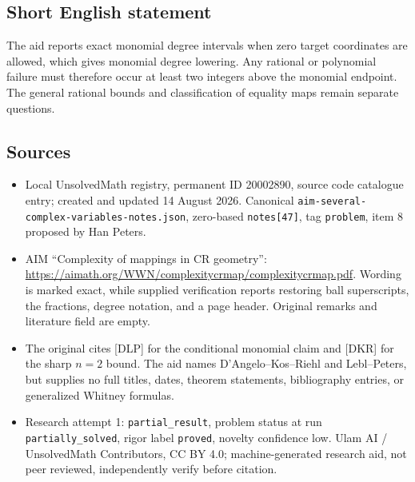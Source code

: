 \documentclass[11pt]{article}
\begin{document}
\subsection{Short English statement}
The aid reports exact monomial degree intervals when zero target coordinates are allowed, which gives monomial degree lowering. Any rational or polynomial failure must therefore occur at least two integers above the monomial endpoint. The general rational bounds and classification of equality maps remain separate questions.
\subsection{Sources}
\begin{itemize}
\item Local UnsolvedMath registry, permanent ID 20002890, source code catalogue entry; created and updated 14 August 2026. Canonical \texttt{aim-several-complex-variables-notes.json}, zero-based \texttt{notes[47]}, tag \texttt{problem}, item 8 proposed by Han Peters.
\item AIM ``Complexity of mappings in CR geometry'': \url{https://aimath.org/WWN/complexitycrmap/complexitycrmap.pdf}. Wording is marked exact, while supplied verification reports restoring ball superscripts, the fractions, degree notation, and a page header. Original remarks and literature field are empty.
\item The original cites [DLP] for the conditional monomial claim and [DKR] for the sharp $n=2$ bound. The aid names D'Angelo--Kos--Riehl and Lebl--Peters, but supplies no full titles, dates, theorem statements, bibliography entries, or generalized Whitney formulas.
\item Research attempt 1: \texttt{partial\_result}, problem status at run \texttt{partially\_solved}, rigor label \texttt{proved}, novelty confidence low. Ulam AI / UnsolvedMath Contributors, CC BY 4.0; machine-generated research aid, not peer reviewed, independently verify before citation.
\end{itemize}
\end{document}
